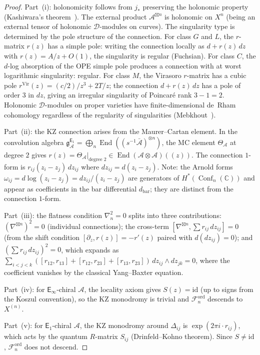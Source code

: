 \documentclass[11pt,reqno]{amsart}
\theoremstyle{definition}
\theoremstyle{remark}
\newcommand{\cA}{\mathcal{A}}
\newcommand{\cD}{\mathcal{D}}
\newcommand{\cF}{\mathcal{F}}
\newcommand{\Eone}{\mathsf{E}_{1}}
\newcommand{\Einf}{\mathsf{E}_{\infty}}
\DeclareMathOperator{\End}{End}
\DeclareMathOperator{\Conf}{Conf}
\newcommand{\gEone}{\mathfrak{g}^{\Eone}_{\cA}}
\newcommand{\CC}{\mathbb{C}}
\numberwithin{equation}{section}
\begin{document}
\begin{proof}
Part~(i): holonomicity follows from
$j_*$ preserving the holonomic property
(Kashiwara's theorem~\cite{Kashiwara03}).
The external product $\cA^{\boxtimes n}$ is holonomic on
$X^n$ (being an external tensor of holonomic $\cD$-modules
on curves). The singularity type is determined by the
pole structure of the connection. For class $G$ and $L$,
the $r$-matrix $r(z)$ has a simple pole: writing the
connection locally as $d + r(z)\,dz$ with
$r(z) = A/z + O(1)$, the singularity is regular
(Fuchsian). For class $C$, the $d$-log absorption
of the OPE simple pole produces a connection with at
worst logarithmic singularity: regular.
For class $M$, the Virasoro $r$-matrix has a cubic pole
$r^{\mathrm{Vir}}(z) = (c/2)/z^3 + 2T/z$; the connection
$d + r(z)\,dz$ has a pole of order $3$ in $dz$, giving
an irregular singularity of Poincar\'e rank $3 - 1 = 2$.
Holonomic $\cD$-modules on proper varieties have
finite-dimensional de~Rham cohomology regardless of the
regularity of singularities
(Mebkhout~\cite{Mebkhout84}).

Part~(ii): the KZ connection arises from the Maurer--Cartan
element. In the convolution algebra
$\gEone = \bigoplus_n
\End((s^{-1}\bar{\cA})^{\otimes n})$,
the MC element $\Theta_\cA$ at degree $2$ gives
$r(z) = \Theta_\cA|_{\text{degree } 2}
\in \End(\cA \otimes \cA)((z))$.
The connection $1$-form is $r_{ij}(z_i - z_j)\,dz_{ij}$
where $dz_{ij} = d(z_i - z_j)$. Note: the Arnold forms
$\omega_{ij} = d\log(z_i - z_j) = dz_{ij}/(z_i - z_j)$
are generators of $H^*(\Conf_n(\CC))$ and appear as
coefficients in the bar differential $d_{\mathrm{bar}}$;
they are distinct from the connection $1$-form.

Part~(iii): the flatness condition $\nabla_n^2 = 0$
splits into three contributions:
$(\nabla^{\boxtimes n})^2 = 0$ (individual connections);
the cross-term
$[\nabla^{\boxtimes n}, \sum r_{ij}\,dz_{ij}] = 0$
(from the shift condition $[\partial_z, r(z)] = -r'(z)$
paired with $d(dz_{ij}) = 0$);
and $(\sum r_{ij}\,dz_{ij})^2 = 0$, which expands as
$\sum_{i<j<k} ([r_{12}, r_{13}] + [r_{12}, r_{23}]
+ [r_{13}, r_{23}]) \, dz_{ij} \wedge dz_{jk} = 0$,
where the coefficient vanishes by the classical
Yang--Baxter equation.

Part~(iv): for $\Einf$-chiral $\cA$, the locality axiom
gives $S(z) = \mathrm{id}$ (up to signs from the Koszul
convention), so the KZ monodromy is trivial and
$\cF_n^{\mathrm{ord}}$ descends to $X^{(n)}$.

Part~(v): for $\Eone$-chiral $\cA$, the KZ monodromy around
$\Delta_{ij}$ is $\exp(2\pi i \cdot r_{ij})$, which acts
by the quantum $R$-matrix $S_{ij}$
(Drinfeld--Kohno theorem). Since $S \neq \mathrm{id}$,
$\cF_n^{\mathrm{ord}}$ does not descend.
\end{proof}
\end{document}
